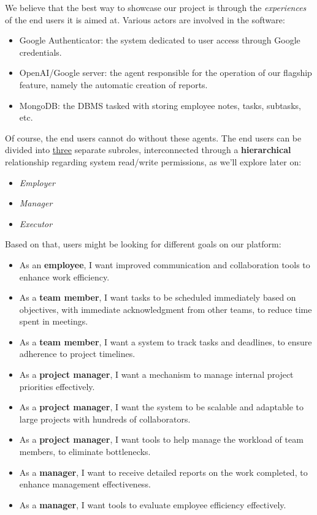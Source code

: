 \documentclass{article}
\begin{document}
We believe that the best way to showcase our project is through the \textit{experiences} of the end users it is aimed at. Various actors are involved in the software:
\begin{itemize}
  \item Google Authenticator: the system dedicated to user access through Google credentials.
  \item OpenAI/Google server: the agent responsible for the operation of our flagship feature, namely the automatic creation of reports.
  \item MongoDB: the DBMS tasked with storing employee notes, tasks, subtasks, etc.
\end{itemize}
Of course, the end users cannot do without these agents. The end users can be divided into \underline{three} separate subroles, interconnected through a \textbf{hierarchical} relationship regarding system read/write permissions, as we'll explore later on:
\begin{itemize}
  \item \textit{Employer}
  \item \textit{Manager}
  \item \textit{Executor}
\end{itemize}

Based on that, users might be looking for different goals on our platform:
\begin{itemize}
    \item As an \textbf{employee}, I want improved communication and collaboration tools to enhance work efficiency.
    \item As a \textbf{team member}, I want tasks to be scheduled immediately based on objectives, with immediate acknowledgment from other teams, to reduce time spent in meetings.
    \item As a \textbf{team member}, I want a system to track tasks and deadlines, to ensure adherence to project timelines.
    \item As a \textbf{project manager}, I want a mechanism to manage internal project priorities effectively.
    \item As a \textbf{project manager}, I want the system to be scalable and adaptable to large projects with hundreds of collaborators.
    \item As a \textbf{project manager}, I want tools to help manage the workload of team members, to eliminate bottlenecks.
    \item As a \textbf{manager}, I want to receive detailed reports on the work completed, to enhance management effectiveness.
    \item As a \textbf{manager}, I want tools to evaluate employee efficiency effectively.
\end{itemize}
\end{document}
